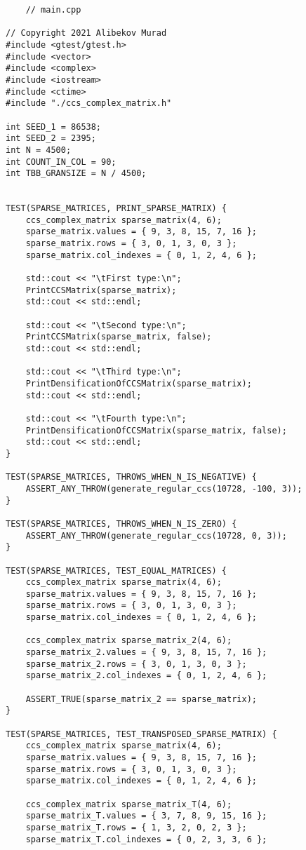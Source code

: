 \documentclass{report}
\begin{document}
	\begin{lstlisting}
	// main.cpp

// Copyright 2021 Alibekov Murad
#include <gtest/gtest.h>
#include <vector>
#include <complex>
#include <iostream>
#include <ctime>
#include "./ccs_complex_matrix.h"

int SEED_1 = 86538;
int SEED_2 = 2395;
int N = 4500;
int COUNT_IN_COL = 90;
int TBB_GRANSIZE = N / 4500;


TEST(SPARSE_MATRICES, PRINT_SPARSE_MATRIX) {
    ccs_complex_matrix sparse_matrix(4, 6);
    sparse_matrix.values = { 9, 3, 8, 15, 7, 16 };
    sparse_matrix.rows = { 3, 0, 1, 3, 0, 3 };
    sparse_matrix.col_indexes = { 0, 1, 2, 4, 6 };

    std::cout << "\tFirst type:\n";
    PrintCCSMatrix(sparse_matrix);
    std::cout << std::endl;

    std::cout << "\tSecond type:\n";
    PrintCCSMatrix(sparse_matrix, false);
    std::cout << std::endl;

    std::cout << "\tThird type:\n";
    PrintDensificationOfCCSMatrix(sparse_matrix);
    std::cout << std::endl;

    std::cout << "\tFourth type:\n";
    PrintDensificationOfCCSMatrix(sparse_matrix, false);
    std::cout << std::endl;
}

TEST(SPARSE_MATRICES, THROWS_WHEN_N_IS_NEGATIVE) {
    ASSERT_ANY_THROW(generate_regular_ccs(10728, -100, 3));
}

TEST(SPARSE_MATRICES, THROWS_WHEN_N_IS_ZERO) {
    ASSERT_ANY_THROW(generate_regular_ccs(10728, 0, 3));
}

TEST(SPARSE_MATRICES, TEST_EQUAL_MATRICES) {
    ccs_complex_matrix sparse_matrix(4, 6);
    sparse_matrix.values = { 9, 3, 8, 15, 7, 16 };
    sparse_matrix.rows = { 3, 0, 1, 3, 0, 3 };
    sparse_matrix.col_indexes = { 0, 1, 2, 4, 6 };
    
    ccs_complex_matrix sparse_matrix_2(4, 6);
    sparse_matrix_2.values = { 9, 3, 8, 15, 7, 16 };
    sparse_matrix_2.rows = { 3, 0, 1, 3, 0, 3 };
    sparse_matrix_2.col_indexes = { 0, 1, 2, 4, 6 };
    
    ASSERT_TRUE(sparse_matrix_2 == sparse_matrix);
}

TEST(SPARSE_MATRICES, TEST_TRANSPOSED_SPARSE_MATRIX) {
    ccs_complex_matrix sparse_matrix(4, 6);
    sparse_matrix.values = { 9, 3, 8, 15, 7, 16 };
    sparse_matrix.rows = { 3, 0, 1, 3, 0, 3 };
    sparse_matrix.col_indexes = { 0, 1, 2, 4, 6 };
    
    ccs_complex_matrix sparse_matrix_T(4, 6);
    sparse_matrix_T.values = { 3, 7, 8, 9, 15, 16 };
    sparse_matrix_T.rows = { 1, 3, 2, 0, 2, 3 };
    sparse_matrix_T.col_indexes = { 0, 2, 3, 3, 6 };
    

\end{lstlisting}
\end{document}
